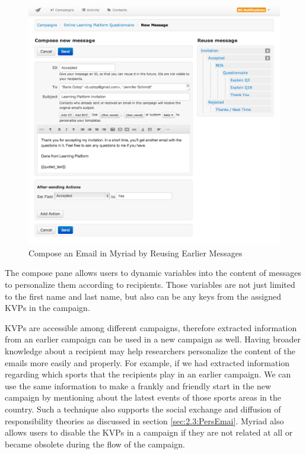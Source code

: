 \begin{figure}[htbp]
	\centering
	\includegraphics[width=1.00\textwidth]{imgs/ComposeEmail.png}
	\caption[Compose an Email in Myriad by Reusing Earlier Messages]{Compose an Email in Myriad by Reusing Earlier Messages}
	\label{fig:ComposeEmail}
\end{figure}

The compose pane allows users to dynamic variables into the content of messages to personalize them according to recipients. Those variables are not just limited to the first name and last name, but also can be any keys from the assigned \ac{KVP}s in the campaign.
\vspace{1cm}

\ac{KVP}s are accessible among different campaigns, therefore extracted information from an earlier campaign can be used in a new campaign as well. Having broader knowledge about a recipient may help  researchers personalize the content of the emails more easily and properly. For example, if we had extracted information regarding which sports that the recipients play in an earlier campaign. We can use the same information to make a frankly and friendly start in the new campaign by mentioning about the latest events of those sports areas in the country. Such a technique also supports the social exchange and diffusion of responsibility theories as discussed in section \ref{sec:2.3:PersEmai}. Myriad also allows users to disable the \ac{KVP}s in a campaign if they are not related at all or became obsolete during the flow of the campaign.


